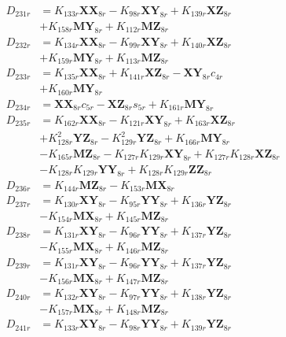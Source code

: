 \begin{multicols}{2}
\begin{align}
D_{231r} &= K_{133r}\mathbf{XX}_{8r} - K_{98r}\mathbf{XY}_{8r} + K_{139r}\mathbf{XZ}_{8r}  \nonumber \\
&+ K_{158r}\mathbf{MY}_{8r} + K_{112r}\mathbf{MZ}_{8r} \nonumber \\
D_{232r} &= K_{134r}\mathbf{XX}_{8r} - K_{99r}\mathbf{XY}_{8r} + K_{140r}\mathbf{XZ}_{8r}  \nonumber \\
&+ K_{159r}\mathbf{MY}_{8r} + K_{113r}\mathbf{MZ}_{8r} \nonumber \\
D_{233r} &= K_{135r}\mathbf{XX}_{8r} + K_{141r}\mathbf{XZ}_{8r} - \mathbf{XY}_{8r}c_{4r}  \nonumber \\
&+ K_{160r}\mathbf{MY}_{8r} \nonumber \\
D_{234r} &= \mathbf{XX}_{8r}c_{5r} - \mathbf{XZ}_{8r}s_{5r} + K_{161r}\mathbf{MY}_{8r} \nonumber \\
D_{235r} &= K_{162r}\mathbf{XX}_{8r} - K_{121r}\mathbf{XY}_{8r} + K_{163r}\mathbf{XZ}_{8r}  \nonumber \\
&+ K_{128r}^2\mathbf{YZ}_{8r} - K_{129r}^2\mathbf{YZ}_{8r} + K_{166r}\mathbf{MY}_{8r}  \nonumber \\
&- K_{165r}\mathbf{MZ}_{8r} - K_{127r}K_{129r}\mathbf{XY}_{8r} + K_{127r}K_{128r}\mathbf{XZ}_{8r}  \nonumber \\
&- K_{128r}K_{129r}\mathbf{YY}_{8r} + K_{128r}K_{129r}\mathbf{ZZ}_{8r} \nonumber \\
D_{236r} &= K_{144r}\mathbf{MZ}_{8r} - K_{153r}\mathbf{MX}_{8r} \nonumber \\
D_{237r} &= K_{130r}\mathbf{XY}_{8r} - K_{95r}\mathbf{YY}_{8r} + K_{136r}\mathbf{YZ}_{8r}  \nonumber \\
&- K_{154r}\mathbf{MX}_{8r} + K_{145r}\mathbf{MZ}_{8r} \nonumber \\
D_{238r} &= K_{131r}\mathbf{XY}_{8r} - K_{96r}\mathbf{YY}_{8r} + K_{137r}\mathbf{YZ}_{8r}  \nonumber \\
&- K_{155r}\mathbf{MX}_{8r} + K_{146r}\mathbf{MZ}_{8r} \nonumber \\
D_{239r} &= K_{131r}\mathbf{XY}_{8r} - K_{96r}\mathbf{YY}_{8r} + K_{137r}\mathbf{YZ}_{8r}  \nonumber \\
&- K_{156r}\mathbf{MX}_{8r} + K_{147r}\mathbf{MZ}_{8r} \nonumber \\
D_{240r} &= K_{132r}\mathbf{XY}_{8r} - K_{97r}\mathbf{YY}_{8r} + K_{138r}\mathbf{YZ}_{8r}  \nonumber \\
&- K_{157r}\mathbf{MX}_{8r} + K_{148r}\mathbf{MZ}_{8r} \nonumber \\
D_{241r} &= K_{133r}\mathbf{XY}_{8r} - K_{98r}\mathbf{YY}_{8r} + K_{139r}\mathbf{YZ}_{8r}  \nonumber \\

\end{align}
\end{multicols}

